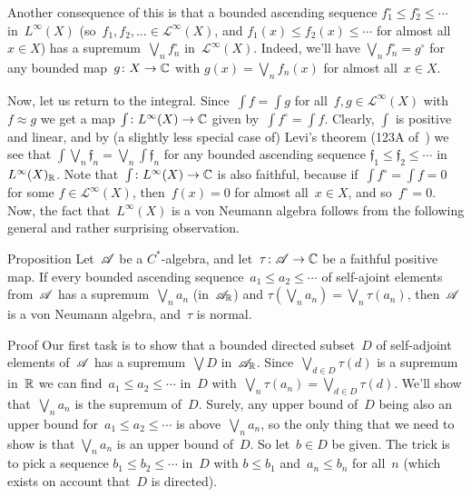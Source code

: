 \documentclass[a]{subfiles}
\begin{document}
\begin{parsec}
\begin{point}
Another consequence of this
is that a bounded ascending sequence
$f_1^\circ \leq f_2^\circ \leq \dotsb$
in~$L^\infty(X)$
(so~$f_1,f_2,\dotsc\in\mathcal{L}^\infty(X)$,
and $f_1(x)\leq f_2(x)\leq\dotsb$ for almost all~$x\in X$)
has a supremum~$\bigvee_n f_n^\circ$ in~$\mathcal{L}^\infty(X)$.
Indeed, we'll have
$\bigvee_n f_n^\circ = g^\circ$
for any bounded map~$g\colon X\to\mathbb{C}$
with $g(x)=\bigvee_n f_n(x)$
for almost all~$x\in X$.
\end{point}%
\begin{point}%
Now, let us return to the integral.
Since~$\int f = \int g$
for all~$f,g\in \mathcal{L}^\infty(X)$
with $f\approx g$
we get a map
$\int \colon L^\infty(X)\to \mathbb{C}$
given
by~$\int  f^\circ = \int f$.
Clearly, $\int$ is positive and linear,
and by (a slightly less special case
of) Levi's theorem (123A of~\cite{fremlin})
we see that $\int \bigvee_n \mathfrak{f}_n
= \bigvee_n \int \mathfrak{f}_n$
for any bounded ascending sequence
$\mathfrak{f}_1\leq \mathfrak{f}_2\leq\dotsb$
in~$L^\infty(X)_{\mathbb{R}}$.
Note that~$\int\colon L^\infty(X)\to\mathbb{C}$
is also faithful,
because if~$\int f^\circ=\int f = 0$
for some $f\in \mathcal{L}^\infty(X)$,
then~$f(x)=0$ for almost all~$x\in X$,
and so~$f^\circ=0$.
Now,
the fact that~$L^\infty(X)$
is a von Neumann algebra follows from
the following general and rather surprising observation.
\end{point}
\begin{point}{Proposition}%
Let~$\mathscr{A}$ be a $C^*$-algebra,
and let~$\tau\colon \mathscr{A}\to\mathbb{C}$
be a faithful positive map.
If every bounded ascending sequence~$a_1\leq a_2\leq \dotsb$
of self-ajoint elements from~$\mathscr{A}$ has a supremum~$\bigvee_n a_n$
(in~$\mathscr{A}_{\mathbb{R}}$)
and
$\tau(\bigvee_n a_n)=\bigvee_n \tau (a_n)$,
then~$\mathscr{A}$ is a von Neumann algebra,
and~$\tau$ is normal.
\begin{point}{Proof}%
Our first task is to show that a bounded
directed subset~$D$ of self-adjoint elements of~$\mathscr{A}$
has a supremum~$\bigvee D$ in~$\mathscr{A}_{\mathbb{R}}$.
Since~$\bigvee_{d\in D} \tau(d)$
is a supremum in~$\mathbb{R}$
we can find~$a_1\leq a_2\leq \dotsb$ in~$D$
with~$\bigvee_n \tau(a_n) = \bigvee_{d\in D} \tau(d)$.
We'll show that~$\bigvee_n a_n$
is the supremum of~$D$.
Surely, any upper bound of~$D$ being also an upper bound 
for~$a_1\leq a_2\leq\dotsb$
is above~$\bigvee_n a_n$,
so the only thing that we need to show is that
$\bigvee_n a_n$ is an upper bound of~$D$.
So let~$b\in D$ be given.
The trick is to pick a sequence
$b_1\leq b_2\leq \dotsb$ in~$D$
with $b\leq b_1$ and~$a_n\leq b_n$ for all~$n$
(which exists on account that~$D$ is directed).

\end{point}
\end{point}
\end{parsec}
\end{document}
